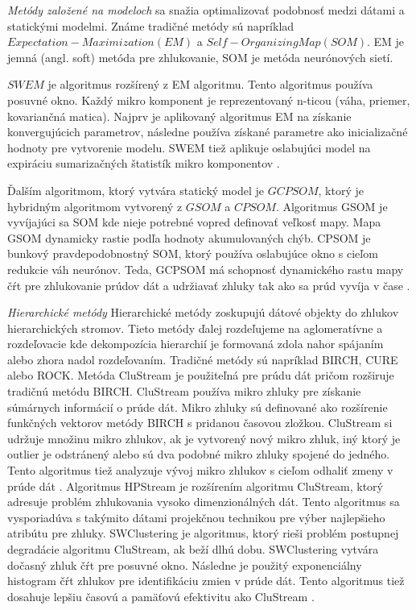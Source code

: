 \textit{Metódy založené na modeloch} sa snažia optimalizovať podobnosť medzi dátami a statickými modelmi. Známe tradičné metódy sú napríklad $Expectation-Maximization (EM)$ a $Self-Organizing Map (SOM)$. EM je jemná (angl. soft) metóda pre zhlukovanie, SOM je metóda neurónových sietí.
\par
$SWEM$ je algoritmus rozšírený z EM algoritmu. Tento algoritmus používa posuvné okno. Každý mikro komponent je reprezentovaný n-ticou (váha, priemer, kovariančná matica). Najprv je aplikovaný algoritmus EM na získanie konvergujúcich parametrov, následne používa získané parametre ako inicializačné hodnoty pre vytvorenie modelu. SWEM tiež aplikuje oslabujúci model na expiráciu sumarizačných štatistík mikro komponentov \citep{nguyen2015survey}.
\par
Ďalším algoritmom, ktorý vytvára statický model je $GCPSOM$, ktorý je hybridným algoritmom vytvorený z $GSOM$ a $CPSOM$. Algoritmus GSOM je vyvíjajúci sa SOM kde nieje potrebné vopred definovať veľkosť mapy. Mapa GSOM dynamicky rastie podľa hodnoty akumulovaných chýb. CPSOM je bunkový pravdepodobnostný SOM, ktorý používa oslabujúce okno s cieľom redukcie váh neurónov. Teda, GCPSOM má schopnosť dynamického rastu mapy čŕt pre zhlukovanie prúdov dát a udržiavať zhluky tak ako sa prúd vyvíja v čase \citep{nguyen2015survey}.

\textit{Hierarchické metódy}
Hierarchické metódy zoskupujú dátové objekty do zhlukov hierarchických stromov. Tieto metódy ďalej rozdeľujeme na aglomeratívne a rozdeľovacie kde dekompozícia hierarchií je formovaná zdola nahor spájaním alebo zhora nadol rozdeľovaním. Tradičné metódy sú napríklad BIRCH, CURE alebo  ROCK. Metóda CluStream je použiteľná pre prúdu dát pričom rozširuje tradičnú metódu BIRCH. CluStream používa mikro zhluky pre získanie súmárnych informácií o prúde dát. Mikro zhluky sú definované ako rozšírenie funkčných vektorov metódy BIRCH s pridanou časovou zložkou. CluStream si udržuje množinu mikro zhlukov, ak je vytvorený nový mikro zhluk, iný ktorý je outlier je odstránený alebo sú dva podobné mikro zhluky spojené do jedného. Tento algoritmus tiež analyzuje vývoj mikro zhlukov s cieľom odhaliť zmeny v prúde dát \citep{nguyen2015survey}. Algoritmus HPStream je rozšírením algoritmu CluStream, ktorý adresuje problém zhlukovania vysoko dimenzionálných dát. Tento algoritmus sa vysporiadúva s takýmito dátami projekčnou technikou pre výber najlepšieho atribútu pre zhluky. SWClustering je algoritmus, ktorý rieši problém postupnej degradácie algoritmu CluStream, ak beží dlhú dobu. SWClustering vytvára dočasný zhluk čŕt pre posuvné okno. Následne je použitý exponenciálny histogram čŕt zhlukov pre identifikáciu zmien v prúde dát. Tento algoritmus tiež dosahuje lepšiu časovú a pamäťovú efektivitu ako CluStream \citep{han2011data}.

